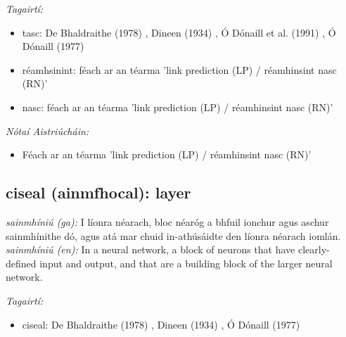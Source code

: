 \documentclass{article}
\begin{document}
 \noindent \textit{Tagairtí:}
\begin{itemize}
	\item tasc: De Bhaldraithe (1978) \cite{de-bhaldraithe}, Dineen (1934) \cite{dineen}, Ó Dónaill et al. (1991) \cite{focloir-beag}, Ó Dónaill (1977) \cite{odonaill}
	\item réamhsinint: féach ar an téarma 'link prediction (LP) / réamhinsint nasc (RN)'
	\item nasc: féach ar an téarma 'link prediction (LP) / réamhinsint nasc (RN)'
\end{itemize}

 \noindent \textit{Nótaí Aistriúcháin:}
\begin{itemize}
	\item Féach ar an téarma 'link prediction (LP) / réamhinsint nasc (RN)'
\end{itemize}


\subsection*{ciseal (ainmfhocal): layer} 
 \noindent \textit{sainmhíniú (ga):} I líonra néarach, bloc néaróg a bhfuil ionchur agus aschur sainmhínithe dó, agus atá mar chuid in-athúsáidte den líonra néarach iomlán.
\newline\newline
 \noindent \textit{sainmhíniú (en):} In a neural network, a block of neurons that have clearly-defined input and output, and that are a building block of the larger neural network.
\newline

 \noindent \textit{Tagairtí:}
\begin{itemize}
	\item ciseal: De Bhaldraithe (1978) \cite{de-bhaldraithe}, Dineen (1934) \cite{dineen}, Ó Dónaill (1977) \cite{odonaill}
\end{itemize}
\end{document}
